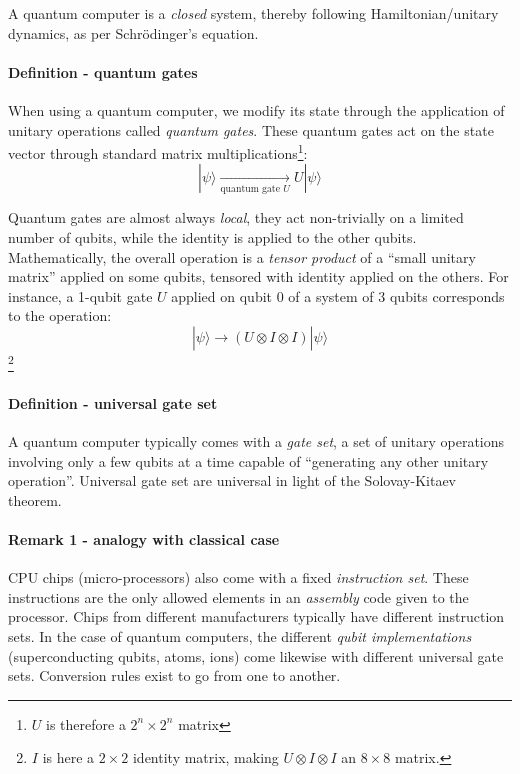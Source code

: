 \documentclass{article}
\begin{document}
A quantum computer is a \emph{closed} system, thereby following Hamiltonian/unitary dynamics, as per Schr\"{o}dinger's equation.

\paragraph{Definition - quantum gates} When using a quantum computer, 
we modify its state through the application of unitary operations called \emph{quantum gates}. 
These quantum gates act on the state vector through standard matrix multiplications\footnote{$U$ is therefore a 
$2^n\times 2^n$ matrix}:
$$|\psi\rangle\xrightarrow[\text{quantum gate }U]{}U|\psi\rangle$$

Quantum gates are almost always \emph{local}, they act non-trivially on a limited number of qubits,
while the identity is applied to the other qubits. Mathematically, the overall operation is 
a \emph{tensor product} of a ``small unitary matrix'' applied on some qubits, tensored with 
identity applied on the others. For instance, a 1-qubit gate $U$ applied on qubit 0 of a system
of $3$ qubits corresponds to the operation:
$$ |\psi\rangle \xrightarrow[]{} (U\otimes I \otimes I) |\psi\rangle $$\footnote{$I$ is here
a $2\times 2$ identity matrix, making $U\otimes I\otimes I$ an $8\times 8$ matrix.}


\paragraph{Definition - universal gate set} A quantum computer
typically comes with a \emph{gate set}, a set of unitary operations
involving only a few qubits at a time capable of ``generating 
any other unitary operation''. 
Universal gate set are universal in light of the Solovay-Kitaev theorem.

\paragraph{Remark 1 - analogy with classical case} CPU chips (micro-processors)
also come with a fixed \emph{instruction set}.
These instructions are the only allowed elements in an
\emph{assembly} code given to the processor. 
Chips from different
manufacturers typically have different instruction sets. 
In the case of quantum computers, the different 
\emph{qubit implementations} (superconducting qubits, atoms, ions)
come likewise with different universal gate sets.
Conversion rules exist to go from one to another.
\end{document}
